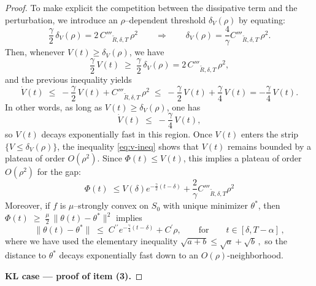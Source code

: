 \documentclass{article} %
\begin{document}
\begin{proof}
To make explicit the competition between the dissipative term and the perturbation, we introduce an $\rho$–dependent threshold $\delta_V(\rho)$ by equating:
\[
\frac{\gamma}{2}\,\delta_V(\rho) = 2\,C'''_{\widetilde R,\delta,T}\,\rho^2
\qquad\Longrightarrow\qquad
\delta_V(\rho) = \frac{4}{\gamma}C'''_{\widetilde R,\delta,T}\,\rho^2.
\]
Then, whenever $V(t)\ge\delta_V(\rho)$, we have
\[
\frac{\gamma}{2}\,V(t)
\;\ge\;
\frac{\gamma}{2}\,\delta_V(\rho)
= 2\,C'''_{\widetilde R,\delta,T}\,\rho^2,
\]
and the previous inequality yields
\[
\dot V(t)
\;\le\;
-\frac{\gamma}{2}\,V(t) + C'''_{\widetilde R,\delta,T}\,\rho^2
\;\le\;
-\frac{\gamma}{2}\,V(t) + \frac{\gamma}{4}\,V(t)
= -\frac{\gamma}{4}\,V(t).
\]
In other words, as long as $V(t)\ge\delta_V(\rho)$, one has
\[
\dot V(t)\;\le\;-\frac{\gamma}{4}\,V(t),
\]
so $V(t)$ decays exponentially fast in this region. Once $V(t)$ enters the strip $\{V\le\delta_V(\rho)\}$, the inequality \ref{eq:v-ineq} shows that $V(t)$ remains bounded by a plateau of order $O(\rho^2)$. Since $\Phi(t)\le V(t)$, this implies a plateau of order $O(\rho^2)$ for the gap:
\[
\Phi(t)\;\leq V(\delta) e^{-\frac{\gamma}{2}(t-\delta)} + \frac{2}{\gamma}C'''_{\widetilde R,\delta,T}\rho^2
\]
Moreover, if $f$ is $\mu$–strongly convex on $S_0$ with unique minimizer $\theta^\ast$, then $\Phi(t) \;\ge\; \frac{\mu}{2}\,\|\theta(t)-\theta^\ast\|^2$ implies
\[
\|\theta(t)-\theta^\ast\| \;\leq\; C^{\prime\prime} e^{-\frac{\gamma}{4}(t-\delta)} + C^\prime\rho, \qquad \text{for} \qquad t\in[\delta, T-\alpha]\,,
\]
where we have used the elementary inequality $\sqrt{a+b} \leq \sqrt{a} + \sqrt{b}\,,$ so the distance to $\theta^\ast$ decays exponentially fast down to an $O(\rho)$-neighborhood.

\medskip
\textbf{KL case — proof of item (3).}


\end{proof}
\end{document}
